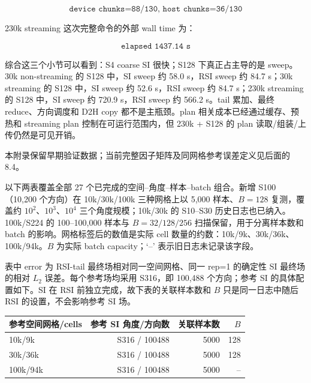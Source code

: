 \documentclass[10pt]{article}
\newcommand{\subsect}[1]{\vspace{2mm}{\sffamily\large\bfseries #1}\par}
\newcommand{\code}[1]{\texttt{#1}}
\begin{document}
\[
\code{device\ chunks=88/130,\ host\ chunks=36/130}
\]

230k streaming 这次完整命令的外部 wall time 为：

\[
\code{elapsed\ 1437.14\ s}
\]

综合这三个小节可以看到：S4 coarse SI 很快；S128 下真正占主导的是 sweep。30k non-streaming 的 S128 中，SI sweep 约 58.0 s，RSI sweep 约 84.7 s；30k streaming 的 S128 中，SI sweep 约 52.6 s，RSI sweep 约 84.7 s；230k streaming 的 S128 中，SI sweep 约 720.9 s，RSI sweep 约 566.2 s。tail 累加、最终 reduce、方向调度和 D2H copy 都不是主瓶颈。plan 相关成本已经通过缓存、预热和 streaming plan 控制在可运行范围内，但 230k + S128 的 plan 读取/组装/上传仍然是可见开销。

\subsect{附录 A：历史 27 组 RSI/SI 并行效率测试}

本附录保留早期验证数据；当前完整因子矩阵及同网格参考误差定义见后面的 8.4。

以下两表覆盖全部 27 个已完成的空间--角度--样本--batch 组合。新增 S100（10,200 个方向）在 10k/30k/100k 三种网格上以 5,000 样本、$B=128$ 复测，覆盖约 $10^2$、$10^3$、$10^4$ 三个角度规模；10k/30k 的 S10--S30 历史日志也已纳入。100k/S224 的 100--100,000 样本与 $B=32/128/256$ 扫描保留，用于分离样本数和 batch 的影响。网格标签后的数值是实际 cell 数量的约数：10k/9k、30k/36k、100k/94k。$B$ 为实际 batch capacity；`--' 表示旧日志未记录该字段。

表中 error 为 RSI-tail 最终场相对同一空间网格、同一 rep=1 的确定性 SI 最终场的相对 $L_2$ 误差。每个参考场均采用 S316，即 100,488 个方向；参考 SI 的具体配置如下。SI 在 RSI 前独立完成，故下表的关联样本数和 $B$ 只是同一日志中随后 RSI 的设置，不会影响参考 SI 场。

{\scriptsize\setlength{\tabcolsep}{4pt}
\begin{tabular}{lrrr}
\toprule
参考空间网格/cells & 参考 SI 角度/方向数 & 关联样本数 & $B$\\
\midrule
10k/9k & S316 / 100488 & 5000 & 128\\
30k/36k & S316 / 100488 & 5000 & 128\\
100k/94k & S316 / 100488 & 5000 & --\\
\bottomrule
\end{tabular}}
\end{document}
